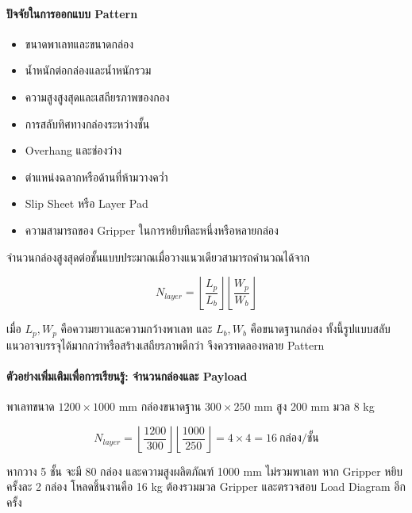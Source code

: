 \paragraph{ปัจจัยในการออกแบบ Pattern}

\begin{itemize}
    \item ขนาดพาเลทและขนาดกล่อง
    \item น้ำหนักต่อกล่องและน้ำหนักรวม
    \item ความสูงสูงสุดและเสถียรภาพของกอง
    \item การสลับทิศทางกล่องระหว่างชั้น
    \item Overhang และช่องว่าง
    \item ตำแหน่งฉลากหรือด้านที่ห้ามวางคว่ำ
    \item Slip Sheet หรือ Layer Pad
    \item ความสามารถของ Gripper ในการหยิบทีละหนึ่งหรือหลายกล่อง
\end{itemize}

จำนวนกล่องสูงสุดต่อชั้นแบบประมาณเมื่อวางแนวเดียวสามารถคำนวณได้จาก

\[
N_{layer}=\left\lfloor\frac{L_p}{L_b}\right\rfloor
\left\lfloor\frac{W_p}{W_b}\right\rfloor
\]

เมื่อ $L_p,W_p$ คือความยาวและความกว้างพาเลท และ $L_b,W_b$ คือขนาดฐานกล่อง ทั้งนี้รูปแบบสลับแนวอาจบรรจุได้มากกว่าหรือสร้างเสถียรภาพดีกว่า จึงควรทดลองหลาย Pattern

\paragraph{ตัวอย่างเพิ่มเติมเพื่อการเรียนรู้: จำนวนกล่องและ Payload}

พาเลทขนาด $1200\times1000$ mm กล่องขนาดฐาน $300\times250$ mm สูง 200 mm มวล 8 kg

\[
N_{layer}=\left\lfloor\frac{1200}{300}\right\rfloor
\left\lfloor\frac{1000}{250}\right\rfloor=4\times4=16\ \text{กล่อง/ชั้น}
\]

หากวาง 5 ชั้น จะมี 80 กล่อง และความสูงผลิตภัณฑ์ 1000 mm ไม่รวมพาเลท หาก Gripper หยิบครั้งละ 2 กล่อง โหลดชิ้นงานคือ 16 kg ต้องรวมมวล Gripper และตรวจสอบ Load Diagram อีกครั้ง

